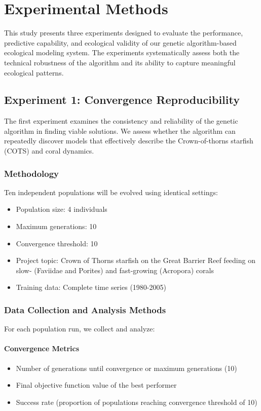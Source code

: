 \section{Experimental Methods}

This study presents three experiments designed to evaluate the performance, predictive capability, and ecological validity of our genetic algorithm-based ecological modeling system. The experiments systematically assess both the technical robustness of the algorithm and its ability to capture meaningful ecological patterns.

\subsection{Experiment 1: Convergence Reproducibility}

The first experiment examines the consistency and reliability of the genetic algorithm in finding viable solutions. We assess whether the algorithm can repeatedly discover models that effectively describe the Crown-of-thorns starfish (COTS) and coral dynamics.

\subsubsection{Methodology}

Ten independent populations will be evolved using identical settings:
\begin{itemize}
\item Population size: 4 individuals
\item Maximum generations: 10
\item Convergence threshold: 10
\item Project topic: Crown of Thorns starfish on the Great Barrier Reef feeding on slow- (Faviidae and Porites) and fast-growing (Acropora) corals
\item Training data: Complete time series (1980-2005)
\end{itemize}

\subsubsection{Data Collection and Analysis Methods}

For each population run, we collect and analyze:

\paragraph{Convergence Metrics}
\begin{itemize}
\item Number of generations until convergence or maximum generations (10)
\item Final objective function value of the best performer
\item Success rate (proportion of populations reaching convergence threshold of 10)
\end{itemize}


